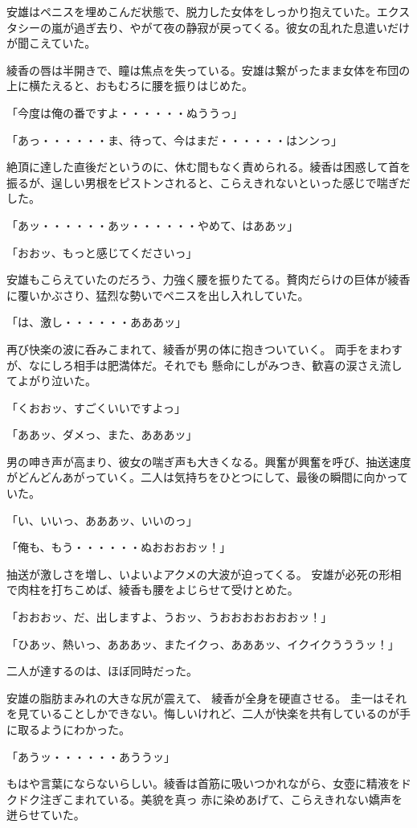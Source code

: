 ﻿\documentclass[book,tate]{jlreq}
\begin{document}
安雄はペニスを埋めこんだ状態で、脱力した女体をしっかり抱えていた。エクスタシーの嵐が過ぎ去り、やがて夜の静寂が戻ってくる。彼女の乱れた息遣いだけが聞こえていた。

綾香の唇は半開きで、瞳は焦点を失っている。安雄は繋がったまま女体を布団の上に横たえると、おもむろに腰を振りはじめた。

「今度は俺の番ですよ・・・・・・ぬううっ」

「あっ・・・・・・ま、待って、今はまだ・・・・・・はンンっ」

絶頂に達した直後だというのに、休む間もなく責められる。綾香は困惑して首を振るが、逞しい男根をピストンされると、こらえきれないといった感じで喘ぎだした。

「あッ・・・・・・あッ・・・・・・やめて、はああッ」

「おおッ、もっと感じてくださいっ」

安雄もこらえていたのだろう、力強く腰を振りたてる。贅肉だらけの巨体が綾香に覆いかぶさり、猛烈な勢いでペニスを出し入れしていた。

「は、激し・・・・・・あああッ」

再び快楽の波に呑みこまれて、綾香が男の体に抱きついていく。 両手をまわすが、なにしろ相手は肥満体だ。それでも 懸命にしがみつき、歓喜の涙さえ流してよがり泣いた。

「くおおッ、すごくいいですよっ」

「ああッ、ダメっ、また、あああッ」

男の呻き声が高まり、彼女の喘ぎ声も大きくなる。興奮が興奮を呼び、抽送速度がどんどんあがっていく。二人は気持ちをひとつにして、最後の瞬間に向かっていた。

「い、いいっ、あああッ、いいのっ」

「俺も、もう・・・・・・ぬおおおおッ！」

抽送が激しさを増し、いよいよアクメの大波が迫ってくる。 安雄が必死の形相で肉柱を打ちこめば、綾香も腰をよじらせて受けとめた。

「おおおッ、だ、出しますよ、うおッ、うおおおおおおおッ！」

「ひあッ、熱いっ、あああッ、またイクっ、あああッ、イクイクうううッ！」

二人が達するのは、ほぼ同時だった。

安雄の脂肪まみれの大きな尻が震えて、 綾香が全身を硬直させる。 圭一はそれを見ていることしかできない。悔しいけれど、二人が快楽を共有しているのが手に取るようにわかった。

「あうッ・・・・・・あううッ」

もはや言葉にならないらしい。綾香は首筋に吸いつかれながら、女壺に精液をドクドク注ぎこまれている。美貌を真っ 赤に染めあげて、こらえきれない嬌声を迸らせていた。
\end{document}
